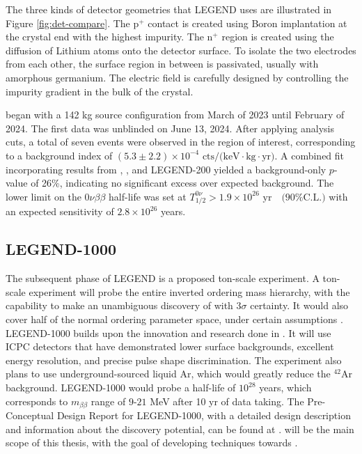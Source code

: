 The three kinds of detector geometries that LEGEND uses are illustrated in Figure \ref{fig:det-compare}. The p$^+$ contact is created using Boron implantation at the crystal end with the highest impurity. The n$^+$ region is created using the diffusion of Lithium atoms onto the detector surface. To isolate the two electrodes from each other, the surface region in between is passivated, usually with amorphous germanium. The electric field is carefully designed by controlling the impurity gradient in the bulk of the crystal. 


{\Ltwo} began with a 142 kg source configuration from March of 2023 until February of 2024. The first data was unblinded on June 13, 2024. After applying analysis cuts, a total of seven events were observed in the region of interest, corresponding to a background index of $ (5.3 \pm 2.2) \times 10^{-4} \text{ cts/(keV$\cdot$kg$\cdot$yr)}$. A combined fit incorporating results from {\Gerda}, {\MJ}, and LEGEND-200 yielded a background-only $p$-value of 26\%, indicating no significant excess over expected background. The lower limit on the 0$\nu\beta\beta$ half-life was set at $T^{0\nu}_{1/2} > 1.9 \times 10^{26} \text{ yr} \quad \text{(90\% C.L.)}$ with an expected sensitivity of $2.8 \times 10^{26}$ years. \cite{Pertoldi2024}

\subsection{LEGEND-1000}
The subsequent phase of LEGEND is a proposed ton-scale experiment. A ton-scale experiment will probe the entire inverted ordering mass hierarchy, with the capability to make an unambiguous discovery of {\onbb} with $3\sigma$ certainty. It would also cover half of the normal ordering parameter space, under certain assumptions \cite{l1000_pcdr}. LEGEND-1000 builds upon the innovation and research done in {\Ltwo}. It will use ICPC detectors that have demonstrated lower surface backgrounds, excellent energy resolution, and precise pulse shape discrimination. The experiment also plans to use underground-sourced liquid Ar, which would greatly reduce the $^{42}$Ar background. LEGEND-1000 would probe a half-life of $10^{28}$ years, which corresponds to $m_{\beta\beta}$ range of $9$-$21$ MeV after 10 yr of data taking. The Pre-Conceptual Design Report for LEGEND-1000, with a detailed design description and information about the discovery potential, can be found at \cite{l1000_pcdr}. {\Ltwo} will be the main scope of this thesis, with the goal of developing techniques towards {\Lthou}.


